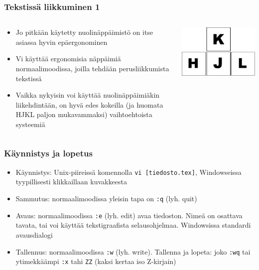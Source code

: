 \documentclass[]{beamer}
\newcommand{\Tohj}[1]{\texttt{#1}}
\newcommand{\com}[1]{{\color{blue!50!black}\Tohj{#1}} \!\!}
\newcommand{\code}[1]{\texttt{#1}}
\newcommand{\key}[1]{\texttt{#1}}
\begin{document}
\begin{frame}
    \frametitle{Tekstissä liikkuminen 1}
    \begin{columns}
    \begin{column}{0.8\textwidth}
    \begin{itemize}
        \item Jo pitkään käytetty nuolinäppäimistö on itse asiassa hyvin epäergonominen
        \item Vi käyttää ergonomisia näppäimiä normaalimoodissa, joilla tehdään perusliikkumista tekstissä
        \item Vaikka nykyisin voi käyttää nuolinäppäimiäkin liikehdintään, on hyvä edes kokeilla (ja huomata HJKL paljon mukavammaksi) vaihtoehtoista systeemiä
    \end{itemize}
    \end{column}
    \begin{column}{0.2\textwidth}
        \includegraphics[width=\textwidth]{hjkl}
    \end{column}
    \end{columns}
\end{frame}

\begin{frame}
    \frametitle{Käynnistys ja lopetus}
    \begin{itemize}
        \item Käynnistys: Unix-piireissä komennolla \code{vi [tiedosto.tex]}, Windowseissa tyypillisesti klikkaillaan kuvakkeesta
        \item Sammutus: normaalimoodissa yleisin tapa on \com{:q} (lyh. quit) 
        \item Avaus: normaalimoodissa \com{:e} (lyh. edit) avaa tiedoston. Nimeä on osattava tavata, tai voi käyttää tekstigraafista selausohjelmaa. Windowsissa standardi avausdialogi
        \item Tallennus: normaalimoodissa \com{:w} (lyh. write). Tallenna ja lopeta: joko \com{:wq} tai ytimekkäämpi \com{:x} tahi \key{ZZ} (kaksi kertaa iso Z-kirjain)
    \end{itemize}
\end{frame}
\end{document}
